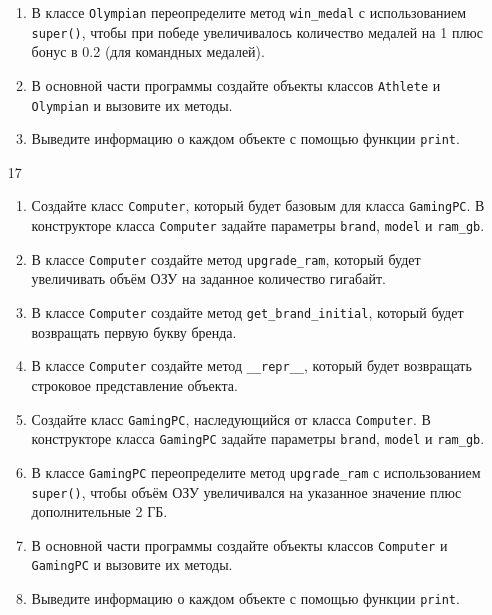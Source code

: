 \begin{enumerate}
\begin{enumerate}[leftmargin=*]
    \item В классе \texttt{Olympian} переопределите метод \texttt{win\_medal} с использованием \texttt{super()}, чтобы при победе увеличивалось количество медалей на 1 плюс бонус в 0.2 (для командных медалей).
    
    \item В основной части программы создайте объекты классов \texttt{Athlete} и \texttt{Olympian} и вызовите их методы.
    
    \item Выведите информацию о каждом объекте с помощью функции \texttt{print}.
\end{enumerate}

\item[17] 
\begin{enumerate}[leftmargin=*]
    \item Создайте класс \texttt{Computer}, который будет базовым для класса \texttt{GamingPC}. В конструкторе класса \texttt{Computer} задайте параметры \texttt{brand}, \texttt{model} и \texttt{ram\_gb}.
    
    \item В классе \texttt{Computer} создайте метод \texttt{upgrade\_ram}, который будет увеличивать объём ОЗУ на заданное количество гигабайт.
    
    \item В классе \texttt{Computer} создайте метод \texttt{get\_brand\_initial}, который будет возвращать первую букву бренда.
    
    \item В классе \texttt{Computer} создайте метод \texttt{\_\_repr\_\_}, который будет возвращать строковое представление объекта.
    
    \item Создайте класс \texttt{GamingPC}, наследующийся от класса \texttt{Computer}. В конструкторе класса \texttt{GamingPC} задайте параметры \texttt{brand}, \texttt{model} и \texttt{ram\_gb}.
    
    \item В классе \texttt{GamingPC} переопределите метод \texttt{upgrade\_ram} с использованием \texttt{super()}, чтобы объём ОЗУ увеличивался на указанное значение плюс дополнительные 2 ГБ.
    
    \item В основной части программы создайте объекты классов \texttt{Computer} и \texttt{GamingPC} и вызовите их методы.
    
    \item Выведите информацию о каждом объекте с помощью функции \texttt{print}.
\end{enumerate}


\end{enumerate}
